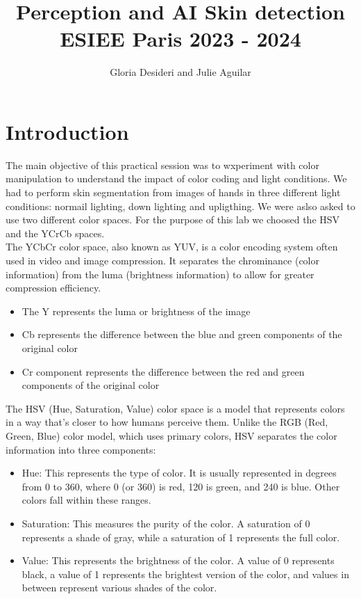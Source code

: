 \documentclass{report}
\title{\Huge{Perception and AI Skin detection}\\ ESIEE Paris 2023 - 2024}
\author{\huge{Gloria Desideri and Julie  Aguilar}}
\date{}
\begin{document}
\maketitle
\newpage%
\tableofcontents
\pagebreak

\chapter{Introduction}
The main objective of this practical session was to wxperiment with color manipulation
to understand the impact of color coding and light conditions. We had to perform
skin segmentation from images of hands in three different light conditions: normail lighting,
down lighting and upligthing. We were aslso asked to use two different color spaces. For 
the purpose of this lab we choosed the HSV and the YCrCb spaces.\\
The YCbCr color space, also known as YUV, is a color encoding system often used in video and image compression. It separates the chrominance (color information) from the luma (brightness information) to allow for greater compression efficiency.
\begin{itemize}
  \item The Y represents the luma or brightness of the image
  \item Cb represents the difference between the blue and green components of the original color
  \item Cr component represents the difference between the red and green components of the original color
\end{itemize}
The HSV (Hue, Saturation, Value) color space is a model that represents colors in a way that's closer to how humans perceive them. Unlike the RGB (Red, Green, Blue) color model, which uses primary colors, HSV separates the color information into three components:
\begin{itemize}
  \item Hue: This represents the type of color. It is usually represented in degrees from 0 to 360, where 0 (or 360) is red, 120 is green, and 240 is blue. Other colors fall within these ranges. 
  \item Saturation: This measures the purity of the color. A saturation of 0 represents a shade of gray, while a saturation of 1 represents the full color.
  \item Value: This represents the brightness of the color. A value of 0 represents black, a value of 1 represents the brightest version of the color, and values in between represent various shades of the color.
\end{itemize}
\end{document}
